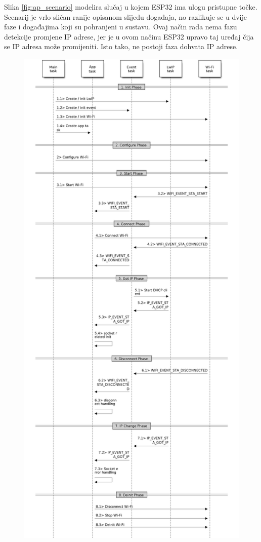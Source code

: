 Slika \ref{fig:ap_scenario} modelira slučaj u kojem ESP32 ima ulogu pristupne točke. Scenarij je vrlo sličan ranije opisanom slijedu događaja, no razlikuje se u dvije faze i događajima koji su pohranjeni u sustavu. Ovaj način rada nema fazu detekcije promjene IP adrese, jer je u ovom načinu ESP32 upravo taj uređaj čija se IP adresa može promijeniti. Isto tako, ne postoji faza dohvata IP adrese. 

\begin{figure}[ht]
	\begin{minipage}[t]{0.4\textwidth}
		\includegraphics[width=\linewidth]{imgs/station_scenario}

\end{minipage}
\end{figure}
